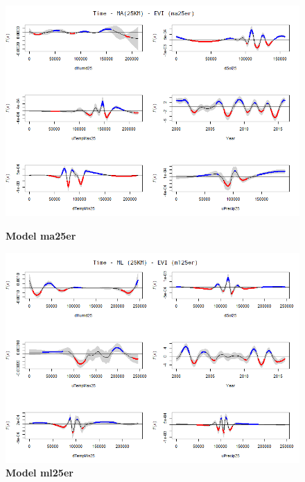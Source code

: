 \begin{figure}[H]
 \centering
    \begin{minipage}{0.8\textwidth}
        \centering
        \includegraphics[width=1.2\textwidth]{ma25er.png} %
        \caption{\textbf{Model ma25er}}
    \end{minipage}\hfill
    \begin{minipage}{0.8\textwidth}
        \centering
        \includegraphics[width=1.2\textwidth]{ml25er.png} %
        \caption{\textbf{Model ml25er}}
    \end{minipage}
\end{figure}


